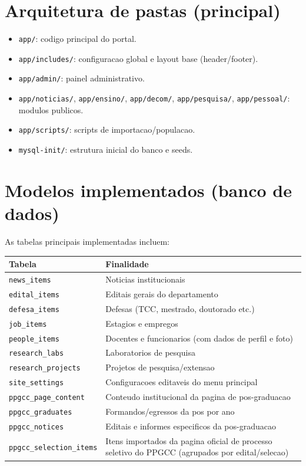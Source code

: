 \documentclass[12pt,a4paper]{article}
\begin{document}
\section{Arquitetura de pastas (principal)}
\begin{itemize}
    \item \texttt{app/}: codigo principal do portal.
    \item \texttt{app/includes/}: configuracao global e layout base (header/footer).
    \item \texttt{app/admin/}: painel administrativo.
    \item \texttt{app/noticias/}, \texttt{app/ensino/}, \texttt{app/decom/}, \texttt{app/pesquisa/}, \texttt{app/pessoal/}: modulos publicos.
    \item \texttt{app/scripts/}: scripts de importacao/populacao.
    \item \texttt{mysql-init/}: estrutura inicial do banco e seeds.
\end{itemize}

\section{Modelos implementados (banco de dados)}
As tabelas principais implementadas incluem:

\begin{longtable}{|p{5cm}|p{9cm}|}
\hline
\textbf{Tabela} & \textbf{Finalidade} \\
\hline
\texttt{news_items} & Noticias institucionais \\
\hline
\texttt{edital_items} & Editais gerais do departamento \\
\hline
\texttt{defesa_items} & Defesas (TCC, mestrado, doutorado etc.) \\
\hline
\texttt{job_items} & Estagios e empregos \\
\hline
\texttt{people_items} & Docentes e funcionarios (com dados de perfil e foto) \\
\hline
\texttt{research_labs} & Laboratorios de pesquisa \\
\hline
\texttt{research_projects} & Projetos de pesquisa/extensao \\
\hline
\texttt{site_settings} & Configuracoes editaveis do menu principal \\
\hline
\texttt{ppgcc_page_content} & Conteudo institucional da pagina de pos-graduacao \\
\hline
\texttt{ppgcc_graduates} & Formandos/egressos da pos por ano \\
\hline
\texttt{ppgcc_notices} & Editais e informes especificos da pos-graduacao \\
\hline
\texttt{ppgcc_selection_items} & Itens importados da pagina oficial de processo seletivo do PPGCC (agrupados por edital/selecao) \\
\hline
\end{longtable}
\end{document}
